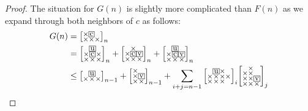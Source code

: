 \documentclass[a4paper,12pt]{article}
\makeatletter
\newcommand{\mybox}[1]{%
  \begingroup
  \setlength{\fboxsep}{1pt}%
  \fbox{\small #1}%
  \endgroup
}
\newenvironment{grid}
  {\begingroup\footnotesize
   \renewcommand{\arraystretch}{0}
   \setlength{\arraycolsep}{0pt}
   \left[\begin{array}{@{}*{10}{c}@{}}}
  {\end{array}\right]\endgroup}
\newcommand{\void}{\phantom{\times}}
\makeatother
\begin{document}
\begin{proof}
The situation for $G(n)$ is slightly more complicated than $F(n)$ as we expand through both neighbors of $c$ as follows:
\begin{align*}
    G(n) &=     \begin{grid}
        \times & \mybox{c} & \void \\
        \times & \times & \times
    \end{grid}_n \\
    &= \begin{grid}
        \void & \mybox{u} & \void \\
        \times & \mybox{c} & \times \\
        \times & \times & \times
    \end{grid}_n
    + \begin{grid}
        \void & \times & \void \\
        \times & \mybox{c} & \mybox{v} \\
        \times & \times & \times
    \end{grid}_n
    + \begin{grid}
        \void & \mybox{u} & \void \\
        \times & \mybox{c} & \mybox{v} \\
        \times & \times & \times
    \end{grid}_n \\
    &\le \begin{grid}
        \void & \mybox{u} & \void \\
        \times & \times & \times
    \end{grid}_{n-1}
    + \begin{grid}
        \times & \void \\
        \times & \mybox{v} \\
        \times & \times
    \end{grid}_{n-1}
    + \sum_{i+j=n-1}\begin{grid}
        \void & \mybox{u} & \times & \void \\
        \times & \times & \times & \times \\
        \times & \times & \times & \void
    \end{grid}_{i}  \begin{grid}
        \void & \times & \void \\
        \times & \times & \void \\
        \times & \times & \mybox{v} \\
        \times & \times & \times
    \end{grid}_{j} \\

\end{align*}
\end{proof}
\end{document}

